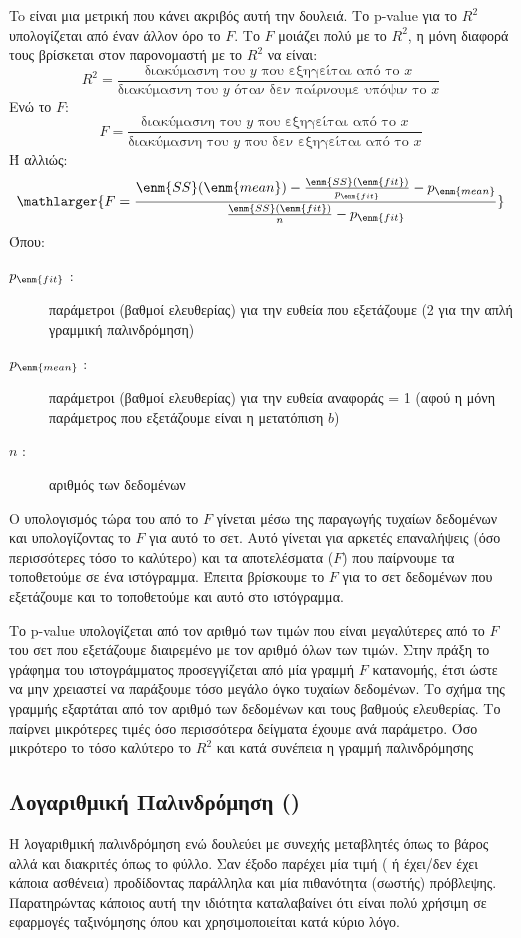 To  είναι μια μετρική που κάνει ακριβός αυτή την δουλειά. Το \textlatin{p-value} για το $R^2$
υπολογίζεται από έναν άλλον όρο το $F$. Το $F$ μοιάζει πολύ με το $R^2$, η μόνη διαφορά τους
βρίσκεται στον παρονομαστή με το $R^2$
να είναι:
$$R^2=\frac{\text{διακύμασνη του }y\text{ που εξηγείται από το }x}{\text{διακύμασνη του }y\text{ όταν δεν παίρνουμε υπόψιν το }x}$$
Ενώ το $F$:
$$F=\frac{\text{διακύμασνη του }y\text{ που εξηγείται από το }x}{\text{διακύμασνη του }y\text{ που δεν εξηγείται από το }x}$$
Ή αλλιώς:
$$\mathlarger{F =\frac{\enm{SS}(\enm{mean}) - \frac{\enm{SS}(\enm{fit})}{p_{\enm{fit}}} - p_{\enm{mean}}} {\frac{\enm{SS}(\enm{fit})}{n} - p_{\enm{fit}}}}$$
Όπου:
\begin{description}
    \item[$p_{\enm{fit}}$ :] παράμετροι (βαθμοί ελευθερίας) για την ευθεία που εξετάζουμε (2 για την απλή γραμμική παλινδρόμηση)
    \item[$p_{\enm{mean}}$ :]  παράμετροι (βαθμοί ελευθερίας) για την ευθεία αναφοράς = 1 (αφού η μόνη παράμετρος που εξετάζουμε είναι η μετατόπιση $b$)
    \item[$n$ :] αριθμός των δεδομένων
\end{description}

Ο υπολογισμός τώρα του  από το $F$ γίνεται μέσω της παραγωγής τυχαίων δεδομένων
και υπολογίζοντας το $F$ για αυτό το σετ. Αυτό γίνεται για αρκετές επαναλήψεις (όσο
περισσότερες τόσο το καλύτερο) και τα αποτελέσματα ($F$) που παίρνουμε τα τοποθετούμε σε
ένα ιστόγραμμα. Έπειτα βρίσκουμε το $F$ για το σετ δεδομένων που εξετάζουμε και το
τοποθετούμε και αυτό στο ιστόγραμμα.

Το p-value υπολογίζεται από τον αριθμό των τιμών
που είναι μεγαλύτερες από το $F$ του σετ που εξετάζουμε διαιρεμένο με τον αριθμό όλων των
τιμών. Στην πράξη το γράφημα του ιστογράμματος προσεγγίζεται από μία γραμμή $F$
κατανομής, έτσι ώστε να μην χρειαστεί να παράξουμε τόσο μεγάλο όγκο τυχαίων δεδομένων.
Το σχήμα της γραμμής εξαρτάται από τον αριθμό των δεδομένων και τους βαθμούς
ελευθερίας. Το  παίρνει μικρότερες τιμές όσο περισσότερα δείγματα έχουμε ανά
παράμετρο. Όσο μικρότερο το  τόσο καλύτερο το $R^2$
και κατά συνέπεια η γραμμή
παλινδρόμησης
\subsection{Λογαριθμική Παλινδρόμηση ()}
Η λογαριθμική παλινδρόμηση ενώ δουλεύει με συνεχής μεταβλητές  όπως το βάρος αλλά και διακριτές
όπως το φύλλο. Σαν έξοδο παρέχει μία
 τιμή ( ή έχει/δεν έχει κάποια ασθένεια) προδίδοντας παράλληλα και μία
πιθανότητα (σωστής) πρόβλεψης. Παρατηρώντας κάποιος αυτή την ιδιότητα καταλαβαίνει
ότι είναι πολύ χρήσιμη σε εφαρμογές ταξινόμησης όπου και χρησιμοποιείται κατά κύριο
λόγο.


